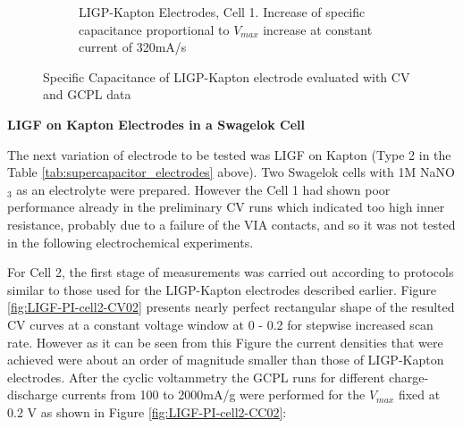 \begin{figure}[H]
\begin{subfigure}{0.49\textwidth}
\captionsetup{width=0.9\linewidth}
\caption{LIGP-Kapton Electrodes, Cell 1. Increase of specific capacitance proportional to $V_{max}$ increase at constant current of  320\:mA/s}
\label{fig:LIG-PI-cell1-C-CC-increase}
\end{subfigure}
\medskip
\caption{Specific Capacitance of LIGP-Kapton electrode evaluated with CV and GCPL data}
\label{fig:LIG-PI-cell1-C-increase}
\end{figure}

\textbf{LIGF on Kapton Electrodes in a Swagelok Cell}

The next variation of electrode to be tested was LIGF on Kapton (Type 2 in the Table \ref{tab:supercapacitor_electrodes} above). Two Swagelok cells with 1M NaNO$_3$ as an electrolyte were prepared. However the Cell 1 had shown poor performance already in the preliminary CV runs which indicated too high inner resistance, probably due to a failure of the VIA contacts, and so it was not tested in the following electrochemical experiments. 

For Cell 2, the first stage of measurements was carried out according to protocols similar to those used for the LIGP-Kapton electrodes described earlier. Figure \ref{fig:LIGF-PI-cell2-CV02} presents nearly perfect rectangular shape of the resulted CV curves at a constant voltage window at 0 - 0.2 for stepwise increased scan rate. However as it can be seen from this Figure the current densities that were achieved were about an order of magnitude smaller than those of LIGP-Kapton electrodes. After the cyclic voltammetry the GCPL runs for different charge-discharge currents from 100 to 2000\:mA/g were performed for the $V_{max}$ fixed at 0.2 V as shown in Figure \ref{fig:LIGF-PI-cell2-CC02}:

